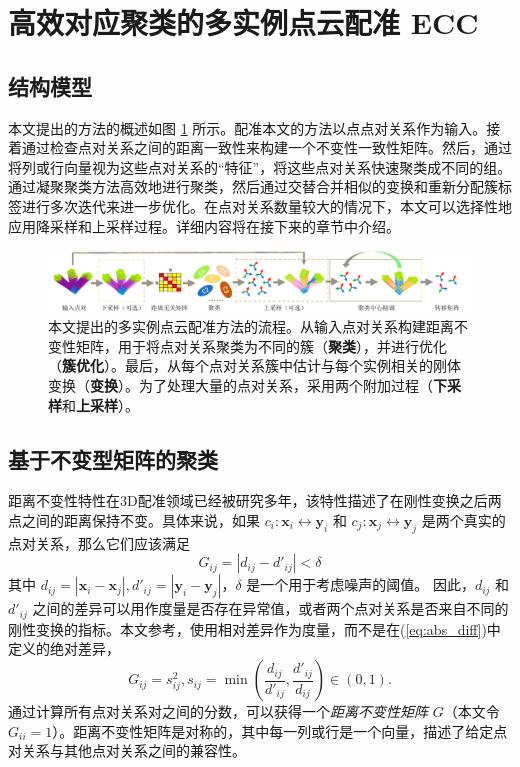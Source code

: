 \section{高效对应聚类的多实例点云配准 ECC}

\subsection{结构模型}
本文提出的方法的概述如图 \ref{fig:multicluster} 所示。配准本文的方法以点点对关系作为输入。接着通过检查点对关系之间的距离一致性来构建一个不变性一致性矩阵。然后，通过将列或行向量视为这些点对关系的“特征”，将这些点对关系快速聚类成不同的组。通过凝聚聚类方法高效地进行聚类，然后通过交替合并相似的变换和重新分配簇标签进行多次迭代来进一步优化。在点对关系数量较大的情况下，本文可以选择性地应用降采样和上采样过程。详细内容将在接下来的章节中介绍。

\begin{figure}[ht]
    \centering
    \includegraphics[width=1\textwidth]{images/multi-cluster.pdf}
    \caption{本文提出的多实例点云配准方法的流程。从输入点对关系构建距离不变性矩阵，用于将点对关系聚类为不同的簇（\textbf{聚类}），并进行优化（\textbf{簇优化}）。最后，从每个点对关系簇中估计与每个实例相关的刚体变换（\textbf{变换}）。为了处理大量的点对关系，采用两个附加过程（\textbf{下采样}和\textbf{上采样}）。}
    \label{fig:multicluster}
    \vspace{-0.6in}
\end{figure}

\subsection{基于不变型矩阵的聚类}
\label{subsec:Distance-Consistency-Graph}
距离不变性特性在3D配准领域已经被研究多年\cite{yang2020teaser, shi2021robin,leordeanu2005spectral}，该特性描述了在刚性变换之后两点之间的距离保持不变。具体来说，如果 $c_i :\boldsymbol{x}_i \leftrightarrow \boldsymbol{y}_i$ 和 $c_j : \boldsymbol{x}_j \leftrightarrow \boldsymbol{y}_j$ 是两个真实的点对关系，那么它们应该满足
%
\begin{equation}
G_{ij}=|d_{ij} - d'_{ij} | < \delta
\label{eq:abs_diff}
\end{equation}
其中 $d_{ij} = |\boldsymbol{x}_i-\boldsymbol{x}_j|, d'_{ij}=|\boldsymbol{y}_i -\boldsymbol{y}_j|$，$\delta $ 是一个用于考虑噪声的阈值。
因此，$d_{ij}$ 和 $d'_{ij}$ 之间的差异可以用作度量是否存在异常值，或者两个点对关系是否来自不同的刚性变换的指标。本文参考\cite{matrix}，使用相对差异作为度量，而不是在(\ref{eq:abs_diff})中定义的绝对差异，
\begin{equation}
G_{ij} = s_{ij}^2, s_{ij} = \min( \frac{d_{ij}}{d'_{ij}}, \frac{d'_{ij}}{d_{ij}}) \in (0, 1).
\end{equation}
通过计算所有点对关系对之间的分数，可以获得一个\emph{距离不变性矩阵} $G$（本文令 $G_{ii} = 1$）。距离不变性矩阵是对称的，其中每一列或行是一个向量，描述了给定点对关系与其他点对关系之间的兼容性\cite{reviewof3dourlierremovingjiaqiYang}。

